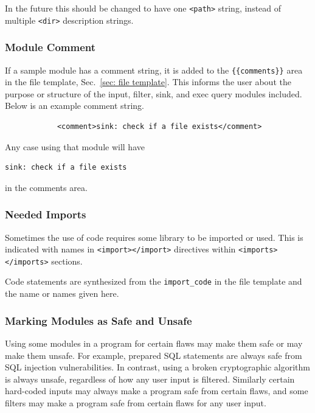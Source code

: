 In the future this should be changed to have one \verb|<path>| string, instead of
multiple \verb|<dir>| description strings.


\subsubsection{Module Comment}
\label{sec:module comment}

If a sample module has a comment string, it is added to the
\verb|{{comments}}| area in the file template, Sec.~\ref{sec: file template}.
This informs the user about the purpose or structure of the input, filter, sink, and
exec query modules included.  Below is an example comment string.

\begin{verbatim}
            <comment>sink: check if a file exists</comment>
\end{verbatim}

Any case using that module will have
\begin{verbatim}
sink: check if a file exists
\end{verbatim}
in the comments area.


\subsubsection{Needed Imports}
\label{sec:module import}

Sometimes the use of code requires some library to be imported or used.  This is
indicated with names in \verb|<import></import>| directives within
\verb|<imports></imports>| sections.

Code statements are synthesized from the \verb|import_code| in the file template and
the name or names given here.


\subsubsection{Marking Modules as Safe and Unsafe}
\label{sec:safe or unsafe}

Using some modules in a program for certain flaws may make them safe or may make them
unsafe.  For example, prepared SQL statements are always safe from SQL injection
vulnerabilities.  In contrast, using a broken cryptographic algorithm is always
unsafe, regardless of how any user input is filtered.  Similarly certain
hard-coded inputs may always make a program safe from certain flaws, and some filters
may make a program safe from certain flaws for any user input.

